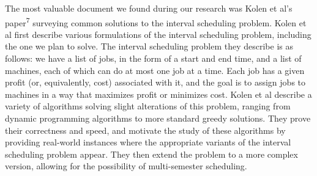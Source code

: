 The most valuable document we found during our research was Kolen et al's paper\textsuperscript{7} 
surveying common solutions to the interval scheduling problem. Kolen et al first describe 
various formulations of the interval scheduling problem, including the one we plan to solve. The 
interval scheduling problem they describe is as follows: we have a list of jobs, in the form of a 
start and end time, and a list of machines, each of which can do at most one job at a time. Each 
job has a given profit (or, equivalently, cost) associated with it, and the goal is to assign jobs to 
machines in a way that maximizes profit or minimizes cost. Kolen et al describe a variety of 
algorithms solving slight alterations of this problem, ranging from dynamic programming 
algorithms to more standard greedy solutions. They prove their correctness and speed, and 
motivate the study of these algorithms by providing real-world instances where the appropriate 
variants of the interval scheduling problem appear. They then extend the problem to a more 
complex version, allowing for the possibility of multi-semester scheduling. 